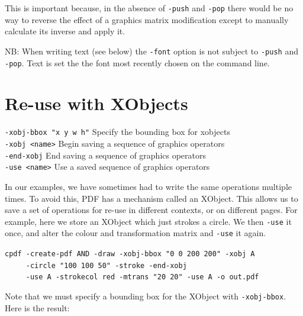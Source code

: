 \documentclass{book}
\begin{document}
\noindent This is important because, in the absence of \texttt{-push} and \texttt{-pop} there would be no way to reverse the effect of a graphics matrix modification except to manually calculate its inverse and apply it.

NB: When writing text (see below) the \texttt{-font} option is not subject to \texttt{-push} and \texttt{-pop}. Text is set the the font most recently chosen on the command line.

\section{Re-use with XObjects}

  {\small\begin{framed}
   \vspace{1.5mm}
   \noindent\verb!-xobj-bbox "x y w h"! Specify the bounding box for xobjects\\
   \noindent\verb!-xobj <name>! Begin saving a sequence of graphics operators\\
   \noindent\verb!-end-xobj! End saving a sequence of graphics operators\\
   \noindent\verb!-use <name>! Use a saved sequence of graphics operators
  \end{framed}}

In our examples, we have sometimes had to write the same operations multiple times. To avoid this, PDF has a mechanism called an XObject. This allows us to save a set of operations for re-use in different contexts, or on different pages. For example, here we store an XObject which just strokes a circle. We then \texttt{-use} it once, and alter the colour and transformation matrix and \texttt{-use} it again.

\begin{framed}
 \noindent\small\verb?cpdf -create-pdf AND -draw -xobj-bbox "0 0 200 200" -xobj A?\\
 \noindent\small\verb?     -circle "100 100 50" -stroke -end-xobj?\\
 \noindent\small\verb?     -use A -strokecol red -mtrans "20 20" -use A -o out.pdf?
\end{framed}

\noindent Note that we must specify a bounding box for the XObject with \texttt{-xobj-bbox}. Here is the result:
\end{document}
